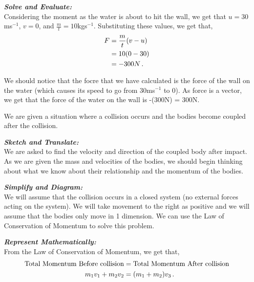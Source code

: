 \begin{subquestions}
	
	
	
	
\textbf{\textit{Solve and Evaluate:}} \\
Considering the moment as the water is about to hit the wall, we get that $u=30$ms$^{-1}$, $v=0$, and $\frac{m}{t}=10$kgs$^{-1}$. Substituting these values, we get that,
\begin{align}
	F & = \frac{m}{t}(v-u) \nonumber \\
	  & = 10(0-30) \nonumber \\
	  & = -300N \,.
\end{align}	
	
We should notice that the focre that we have calculated is the force of the wall on the water (which causes its speed to go from 30ms$^{-1}$ to 0). As force is a vector, we get that the force of the water on the wall is -(300N) = 300N.
	

\subquestion
We are given a situation where a collision occurs and the bodies become coupled after the collision.

\textbf{\textit{Sketch and Translate:}} \\
We are asked to find the velocity and direction of the coupled body after impact. As we are given the mass and velocities of the bodies, we should begin thinking about what we know about their relationship and the momentum of the bodies. 
	
	
	
	
\textbf{\textit{Simplify and Diagram:}} \\
We will assume that the collision occurs in a closed system (no external forces acting on the system). We will take movement to the right as positive and we will assume that the bodies only move in 1 dimension. We can use the Law of Conservation of Momentum to solve this problem.




\textbf{\textit{Represent Mathematically:}} \\
From the Law of Conservation of Momentum, we get that,
\begin{align}
	\text{Total Momentum Before collision} & = \text{Total Momentum After collision} \nonumber \\
	m_1v_1 + m_2v_2 & = (m_1+m_2)v_3 \,.
\end{align}
	

\end{subquestions}
